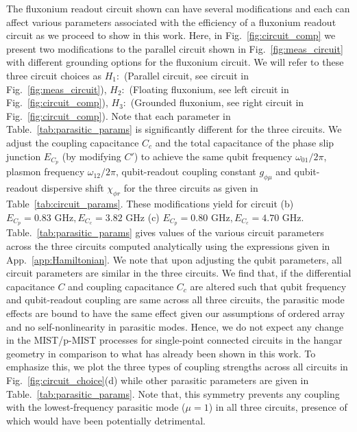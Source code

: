 \documentclass[%
reprint,
superscriptaddress,
 amsmath,amssymb,
 aps,
 prx,
longbibliography,
floatfix,
]{revtex4-2}
\begin{document}
The fluxonium readout circuit shown can have several modifications and each can affect various parameters associated with the efficiency of a fluxonium readout circuit as we proceed to show in this work. Here, in Fig.~\ref{fig:circuit_comp} we present two modifications to the parallel circuit shown in Fig.~\ref{fig:meas_circuit} with different grounding options for the fluxonium circuit. We will refer to these three circuit choices as $H_1:$ (Parallel circuit, see circuit in Fig.~\ref{fig:meas_circuit}), $H_2:$ (Floating fluxonium, see left circuit in Fig.~\ref{fig:circuit_comp}), $H_3:$ (Grounded fluxonium, see right circuit in Fig.~\ref{fig:circuit_comp}). Note that each parameter in Table.~\ref{tab:parasitic_params} is significantly different for the three circuits. We adjust the coupling capacitance $C_c$ and the total capacitance of the phase slip junction $E_{C_p}$ (by modifying $C'$) to achieve the same qubit frequency $\omega_{01}/2\pi$, plasmon frequency $\omega_{12}/2\pi$, qubit-readout coupling constant $g_{\phi \mu}$ and qubit-readout dispersive shift $\chi_{\phi r}$ for the three circuits as given in Table~\ref{tab:circuit_params}. These modifications yield for circuit (b)$E_{C_p}=0.83  \textrm{ GHz},E_{C_c}=3.82\textrm{ GHz}$ (c) $E_{C_p}=0.80\textrm{ GHz},E_{C_c}=4.70\textrm{ GHz}$. Table.~\ref{tab:parasitic_params} gives values of the various circuit parameters across the three circuits computed analytically using the expressions given in App.~\ref{app:Hamiltonian}. We note that upon adjusting the qubit parameters, all circuit parameters are similar in the three circuits. We find that, if the differential capacitance $C$ and coupling capacitance $C_c$ are altered such that qubit frequency and qubit-readout coupling are same across all three circuits, the parasitic mode effects are bound to have the same effect given our assumptions of ordered array and no self-nonlinearity in parasitic modes. Hence, we do not expect any change in the MIST/p-MIST processes for single-point connected circuits in the hangar geometry in comparison to what has already been shown in this work.
To emphasize this, we plot the three types of coupling strengths across all circuits in Fig.~\ref{fig:circuit_choice}(d) while other parasitic parameters are given in Table.~\ref{tab:parasitic_params}. Note that, this symmetry prevents any coupling with the lowest-frequency parasitic mode ($\mu=1$) in all three circuits, presence of which would have been potentially detrimental. 
\end{document}
